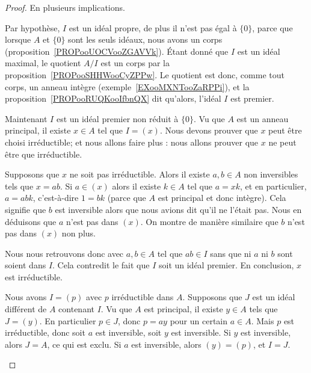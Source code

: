 \begin{proof}
    En plusieurs implications.
    \begin{subproof}
        \item[\ref{ITEMooNOVFooEHtcwE} implique~\ref{ITEMooMQWVooNocVEU}]

            Par hypothèse, \( I\) est un idéal propre, de plus il n'est pas égal à \( \{ 0 \}\), parce que lorsque \( A\) et \( \{ 0 \} \) sont les seuls idéaux, nous avons un corps (proposition~\ref{PROPooUOCVooZGAVVk}). Étant donné que \( I\) est un idéal maximal, le quotient \( A/I\) est un corps par la proposition~\ref{PROPooSHHWooCyZPPw}. Le quotient est donc, comme tout corps, un anneau intègre (exemple~\ref{EXooMXNTooZaRPPi}), et la proposition~\ref{PROPooRUQKooIfbnQX} dit qu'alors, l'idéal \(I \) est premier.


        \item[\ref{ITEMooMQWVooNocVEU} implique~\ref{ITEMooJBXGooEISNuW}]

            Maintenant \( I\) est un idéal premier non réduit à \( \{ 0 \}\). Vu que \( A\) est un anneau principal, il existe \( x\in A\) tel que \( I=(x)\). Nous devons prouver que \( x\) peut être choisi irréductible; et nous allons faire plus : nous allons prouver que \( x\) ne peut être que irréductible.

            Supposons que \( x\) ne soit pas irréductible. Alors il existe \( a,b\in A\) non inversibles tels que \( x=ab\). Si \( a\in (x)\) alors il existe \( k\in A\) tel que \( a=xk\), et en particulier, \( a=abk\), c'est-à-dire \( 1=bk\) (parce que \( A\) est principal et donc intègre). Cela signifie que \( b\) est inversible alors que nous avions dit qu'il ne l'était pas. Nous en déduisons que \( a\) n'est pas dans \( (x)\). On montre de manière similaire que \( b\) n'est pas dans \( (x)\) non plus.

            Nous nous retrouvons donc avec \( a,b\in A\) tel que \( ab\in I\) sans que ni \( a\) ni \( b\) sont soient dans \( I\). Cela contredit le fait que \( I\) soit un idéal premier. En conclusion, \( x\) est irréductible.

        \item[\ref{ITEMooJBXGooEISNuW} implique~\ref{ITEMooNOVFooEHtcwE}]

            Nous avons \( I=(p)\) avec \( p\) irréductible dans \( A\). Supposons que \( J\) est un idéal différent de \( A\) contenant \( I\). Vu que \( A\) est principal, il existe \( y\in A\) tels que \( J=(y)\). En particulier \( p\in J\), donc \( p=ay\) pour un certain \( a\in A\). Mais \( p\) est irréductible, donc soit \( a\) est inversible, soit \( y\) est inversible. Si \( y\) est inversible, alors \( J=A\), ce qui est exclu. Si \( a\) est inversible, alors \( (y)=(p)\), et \( I=J\).
    \end{subproof}
\end{proof}

